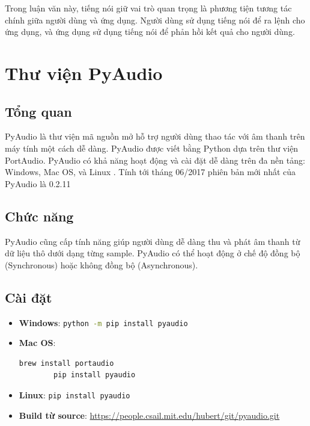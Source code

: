 Trong luận văn này, tiếng nói giữ vai trò quan trọng là phương tiện tương tác chính giữa người dùng và ứng dụng. Người dùng sử dụng tiếng nói để ra lệnh cho ứng dụng, và ứng dụng sử dụng tiếng nói để phản hồi kết quả cho người dùng.

\section{Thư viện PyAudio}
\subsection{Tổng quan}
PyAudio là thư viện mã nguồn mở hỗ trợ người dùng thao tác với âm thanh trên máy tính một cách dễ dàng. PyAudio được viết bằng Python dựa trên thư viện PortAudio. PyAudio có khả năng hoạt động và cài đặt dễ dàng trên đa nền tảng: Windows, Mac OS, và Linux . Tính tới tháng 06/2017 phiên bản mới nhất của PyAudio là 0.2.11

\subsection{Chức năng}
PyAudio cũng cấp tính năng giúp người dùng dễ dàng thu và phát âm thanh từ dữ liệu thô dưới dạng từng sample. PyAudio có thể hoạt động ở chế độ đồng bộ (Synchronous) hoặc không đồng bộ (Asynchronous).

\subsection{Cài đặt}
\begin{itemize}
	\item \textbf{Windows}: \lstinline[language=bash]{python -m pip install pyaudio}
	\item \textbf{Mac OS}:  
		\begin{lstlisting}[language=bash]
		brew install portaudio
		pip install pyaudio
		\end{lstlisting}
	\item \textbf{Linux}: \lstinline[language=bash]{pip install pyaudio}
	\item \textbf{Build từ source}: \url{https://people.csail.mit.edu/hubert/git/pyaudio.git}
\end{itemize}


